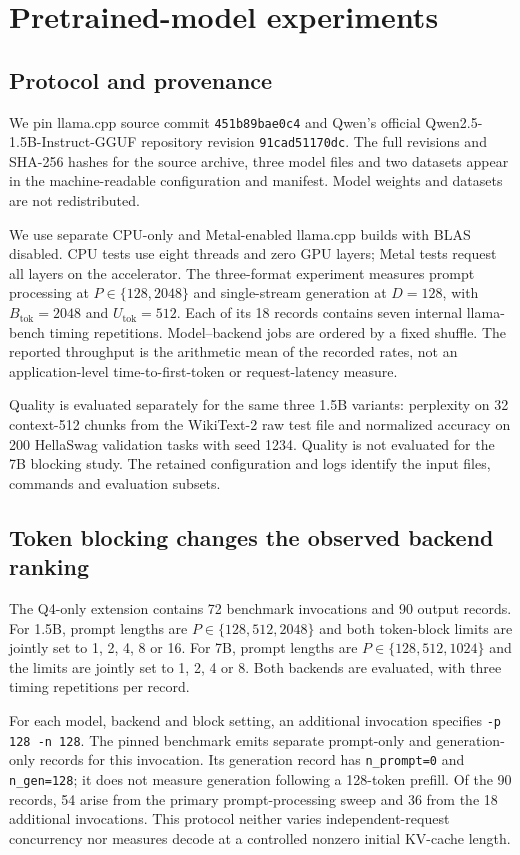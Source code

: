 \documentclass[11pt]{article}
\begin{document}
\section{Pretrained-model experiments}
\subsection{Protocol and provenance}
We pin llama.cpp source commit \texttt{451b89bae0c4} and Qwen's official
Qwen2.5-1.5B-Instruct-GGUF repository revision \texttt{91cad51170dc}.
The full revisions and SHA-256 hashes for the
source archive, three model files and two datasets appear in the machine-readable
configuration and manifest. Model weights and datasets are not redistributed.

We use separate CPU-only and Metal-enabled llama.cpp builds with BLAS disabled.
CPU tests use eight threads and zero GPU layers; Metal tests request all layers
on the accelerator. The three-format experiment measures prompt processing at
$P\in\{128,2048\}$ and single-stream generation at $D=128$, with
$B_{\mathrm{tok}}=2048$ and $U_{\mathrm{tok}}=512$. Each of its 18 records contains
seven internal llama-bench timing repetitions. Model--backend jobs are ordered by
a fixed shuffle. The reported throughput is the arithmetic mean of the recorded
rates, not an application-level time-to-first-token or request-latency measure.

Quality is evaluated separately for the same three 1.5B variants: perplexity on
32 context-512 chunks from the WikiText-2 raw test file and normalized accuracy on
200 HellaSwag validation tasks with seed 1234. Quality is not evaluated for the 7B
blocking study. The retained configuration and logs identify the input files,
commands and evaluation subsets.

\subsection{Token blocking changes the observed backend ranking}
The Q4-only extension contains 72 benchmark invocations and 90 output records.
For 1.5B, prompt lengths are $P\in\{128,512,2048\}$ and both token-block limits
are jointly set to 1, 2, 4, 8 or 16. For 7B, prompt lengths are
$P\in\{128,512,1024\}$ and the limits are jointly set to 1, 2, 4 or 8.
Both backends are evaluated, with three timing repetitions per record.

For each model, backend and block setting, an additional invocation specifies
\texttt{-p 128 -n 128}. The pinned benchmark emits separate prompt-only and
generation-only records for this invocation. Its generation record has
\texttt{n\_prompt=0} and \texttt{n\_gen=128}; it does not measure generation
following a 128-token prefill. Of the 90 records, 54 arise from the primary
prompt-processing sweep and 36 from the 18 additional invocations. This protocol
neither varies independent-request concurrency nor measures decode at a controlled
nonzero initial KV-cache length.
\end{document}
